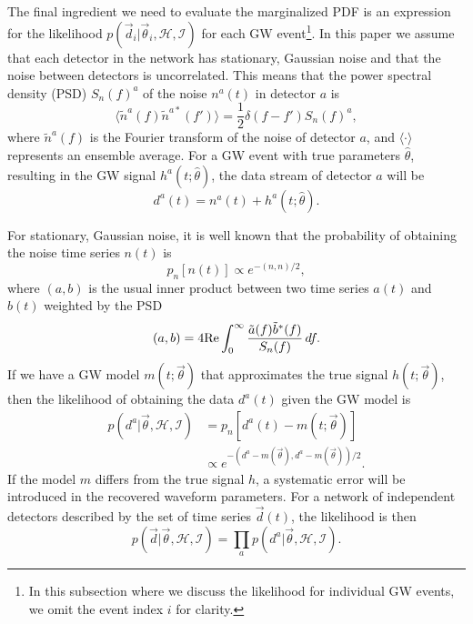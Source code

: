 \documentclass[twocolumn,prd,amssymb,aps,nofootinbib,showpacs,epsf]{revtex4}
\begin{document}
The final ingredient we need to evaluate the marginalized PDF is an expression for the likelihood $p(\vec d_i | \vec\theta_i,\mathcal{H},\mathcal{I})$ for each GW event\footnote{In this subsection where we discuss the likelihood for individual GW events, we omit the event index $i$ for clarity.}. In this paper we assume that each detector in the network has stationary, Gaussian noise and that the noise between detectors is uncorrelated. This means that the power spectral density (PSD) $S_n(f)^a$ of the noise $n^a(t)$ in detector $a$ is
\begin{equation}
\langle \tilde n^a(f) \tilde n^{a*}(f') \rangle = \frac{1}{2} \delta (f-f') S_n(f)^a,
\end{equation}
where $\tilde n^a(f)$ is the Fourier transform of the noise of detector $a$, and $\langle\cdot\rangle$ represents an ensemble average. For a GW event with true parameters $\hat\theta$, resulting in the GW signal $h^a(t; \hat\theta)$, the data stream of detector $a$ will be
\begin{equation}
d^a(t) = n^a(t) + h^a(t; \hat\theta).
\end{equation}

For stationary, Gaussian noise, it is well known that the probability of obtaining the noise time series $n(t)$ is
\begin{equation}
p_n[n(t)] \propto e^{-(n, n)/2},
\end{equation}
where $(a, b)$ is the usual inner product between two time series $a(t)$ and $b(t)$ weighted by the PSD
\begin{equation}
(a, b)=4{\rm Re} \int_0^\infty \frac{\tilde a(f) \tilde b^*(f)}{S_n(f)}\,df.
\end{equation}
If we have a GW model $m(t;\vec\theta)$ that approximates the true signal $h(t;\vec\theta)$, then the likelihood of obtaining the data $d^a(t)$ given the GW model is
\begin{align}
p(d^a | \vec\theta, \mathcal{H}, \mathcal{I}) &= p_n[d^a(t)-m(t; \vec\theta)] \nonumber\\
& \propto e^{-(d^a - m(\vec\theta), d^a - m(\vec\theta))/2}.
\end{align}
If the model $m$ differs from the true signal $h$, a systematic error will be introduced in the recovered waveform parameters. For a network of independent detectors described by the set of time series $\vec d(t)$, the likelihood is then
\begin{equation}
p(\vec d | \vec\theta, \mathcal{H}, \mathcal{I}) = \prod_a p(d^a | \vec\theta, \mathcal{H}, \mathcal{I}).
\end{equation}
\end{document}
